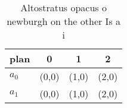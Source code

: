 \documentclass[a4paper]{article}
\begin{document}
\begin{table}
\begin{adjustbox}{width=0.6\columnwidth}
\begin{tabular}{|l|l|l|l|}
\hline
\textbf{plan} & \multicolumn{1}{c|}{\textbf{0}} & \multicolumn{1}{c|}{\textbf{1}} & \multicolumn{1}{c|}{\textbf{2}} \\ \hline
\textbf{$a_0$}  & (0,0) & (1,0) & (2,0) \\ \hline
\textbf{$a_1$}  & (0,0) & (1,0) & (2,0) \\ \hline
\end{tabular}
\end{adjustbox}
\caption{Altostratus opacus o newburgh on the other Is a i
}
\end{table}
\end{document}
